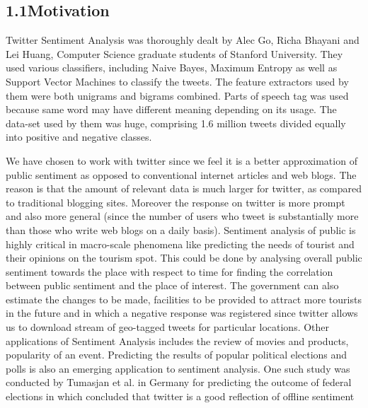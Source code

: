\documentclass[12pt]{article}
\begin{document}
\vspace{\baselineskip}
\subsection*{1.1\hspace*{10pt}Motivation}
\begin{justify}
\tab Twitter Sentiment Analysis was thoroughly dealt by Alec Go, Richa Bhayani and Lei Huang, Computer Science graduate students of Stanford University. They used various classifiers, including Naive Bayes, Maximum Entropy as well as Support Vector Machines to classify the tweets. The feature extractors used by them were both unigrams and bigrams combined. Parts of speech tag was used because same word may have different meaning depending on its usage. The data-set used by them was huge, comprising 1.6 million tweets divided equally into positive and negative classes.
\end{justify}\par

\begin{justify}
\tab We have chosen to work with twitter since we feel it is a better approximation of public sentiment as opposed to conventional internet articles and web blogs. The reason is that the amount of relevant data is much larger for twitter, as compared to traditional blogging sites. Moreover the response on twitter is more prompt and also more general (since the number of users who tweet is substantially more than those who write web blogs on a daily basis). Sentiment analysis of public is highly critical in macro-scale phenomena like predicting the needs of tourist and their opinions on the tourism spot. This could be done by analysing overall public sentiment towards the place with respect to time for finding the correlation between public sentiment and the place of interest. The government can also estimate the changes to be made, facilities to be provided to attract more tourists in the future and in which a negative response was registered since twitter allows us to download stream of geo-tagged tweets for particular locations. Other applications of Sentiment Analysis includes the review of movies and products, popularity of an event. Predicting the results of popular political elections and polls is also an emerging application to sentiment analysis. One such study was conducted by Tumasjan et al. in Germany for predicting the outcome of federal elections in which concluded that twitter is a good reflection of offline sentiment 
\end{justify}\par
\end{document}
